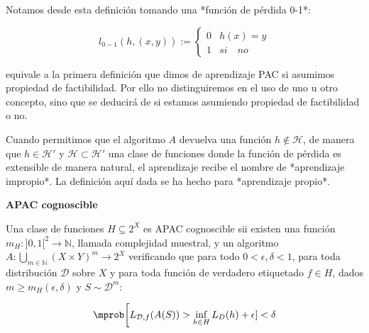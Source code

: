 Notamos desde esta definición tomando una *función de pérdida 0-1*:

\[l_{0-1} (h,(x,y)) := \left\{\begin{array}{ll}
0 & h(x) = y\\
1 & si \quad no
\end{array}\right.\]

equivale a la primera definición que dimos de aprendizaje PAC si asumimos propiedad de factibilidad. Por ello no distinguiremos en el uso de uno u otro concepto, sino que se deducirá de si estamos asumiendo propiedad de factibilidad o no.

Cuando permitimos que el algoritmo $A$ devuelva una función $h \notin \mathcal{H}$, de manera que $h \in \mathcal{H}'$ y $\mathcal{H} \subset \mathcal{H}'$ una clase de funciones donde la función de pérdida es extensible de manera natural, el aprendizaje recibe el nombre de *aprendizaje impropio*. La definición aquí dada se ha hecho para *aprendizaje propio*.


\begin{definition*} \textbf{APAC cognoscible}

Una clase de funciones $H \subseteq 2^X$ es APAC cognoscible sii existen una función 
$m_{H} : ]0,1[^2\rightarrow \mathbb{N}$, llamada complejidad muestral, y un algoritmo 
$A: \underset{m\in \mathbb{N}}{\bigcup} (X\times Y)^m \rightarrow 2^X$ verificando que para todo
$0 < \epsilon, \delta < 1$, para toda distribución $\mathcal{D}$ sobre $X$ y para toda función de 
verdadero etiquetado $f\in H$, dados $m \ge m_H(\epsilon, \delta)$ y $S\sim \mathcal{D}^m$:

\[\mprob \bigg[L_{\mathcal{D},f}(A(S)) > \inf_{h\in H} L_D(h) + \epsilon] < \delta\]
\end{definition*}
